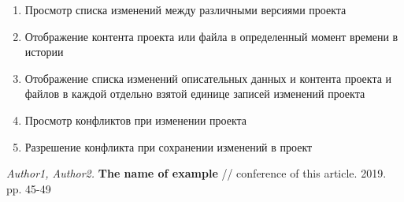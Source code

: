 \documentclass[a4paper,14pt]{extreport} %
\begin{document}
\begin{enumerate}
\item Просмотр списка изменений между различными версиями проекта

\item Отображение контента проекта или файла в определенный момент времени в истории

\item Отображение списка изменений описательных данных и контента проекта и файлов в каждой отдельно взятой единице записей изменений проекта

\item Просмотр конфликтов при изменении проекта

\item Разрешение конфликта при сохранении изменений в проект
\end {enumerate}


\begin{thebibliography}{1}
{\small
{} {\it Author1, Author2.}
\textbf{The name of example} // conference of this article. 2019. pp. 45-49
}
\end{thebibliography}
\end{document}
